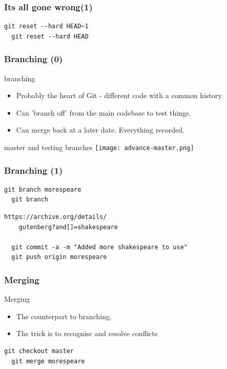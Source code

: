 \documentclass{beamer}
\begin{document}
\begin{frame}[fragile]
  \frametitle{Its all gone wrong(1)}
  
  \begin{lstlisting}[caption=restoring things] 
  git reset --hard HEAD~1
  git reset --hard HEAD
  \end{lstlisting}

\end{frame}


\begin{frame}[fragile]
  \frametitle{Branching (0)}

  \begin{block}{branching}
   \begin{itemize}  
      \item Probably the heart of Git - different code with a common history.
      \item Can 'branch off' from the main codebase to test things.
      \item Can merge back at a later date. Everything recorded.
    \end{itemize}
  \end{block}

  \begin{block}{master and testing branches}
    \texttt{[image: advance-master.png]}
  \end{block}


\end{frame}

\begin{frame}[fragile]
  \frametitle{Branching (1)}

  \begin{lstlisting}[caption=branching] 
  git branch morespeare
  git branch
  \end{lstlisting}

  \begin{lstlisting}[caption=make some changes] 
  https://archive.org/details/
    gutenberg?and[]=shakespeare
  
  git commit -a -m "Added more shakespeare to use"
  git push origin morespeare
  \end{lstlisting}


\end{frame}

\begin{frame}[fragile]
  \frametitle{Merging}

  \begin{block}{Merging}
   \begin{itemize}  
      \item The counterpart to branching.
      \item The trick is to recognise and resolve conflicts
    \end{itemize}
  \end{block}

  \begin{lstlisting}[caption=make some changes] 
  git checkout master 
  git merge morespeare
  \end{lstlisting}

\end{frame}
\end{document}
